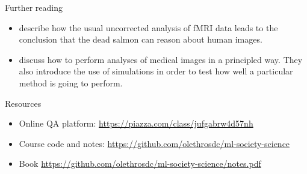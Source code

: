 \begin{frame}
  \begin{block}{Further reading}
    \begin{itemize}
    \item \citet{bennett2012journal} describe how the usual
      uncorrected analysis of fMRI data leads to the conclusion that
      the dead salmon can reason about human images.
    \item \citet{Bennett2009ThePC} discuss how to perform analyses of medical images in a principled way. They also introduce the use of simulations in order to test how well a particular method is going to perform.
    \end{itemize}
  \end{block}

  \begin{block}{Resources}
    \begin{itemize}
    \item Online QA platform: \url{https://piazza.com/class/jufgabrw4d57nh}
    \item Course code and notes:  \url{https://github.com/olethrosdc/ml-society-science}
    \item Book \url{https://github.com/olethrosdc/ml-society-science/notes.pdf}
    \end{itemize}
  \end{block}
\end{frame}






